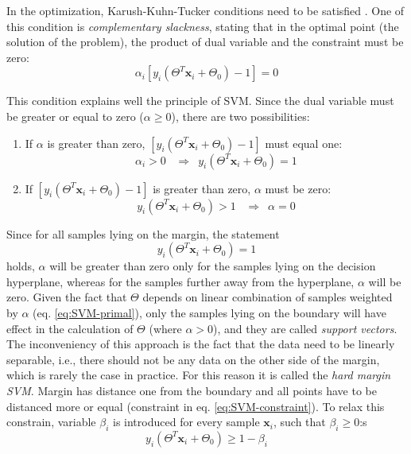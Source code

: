 \begin{appendix}
In the optimization, Karush-Kuhn-Tucker conditions need to be satisfied \citep{Boyd2004}. One of this condition is \emph{complementary slackness}, stating that in the optimal point (the solution of the problem), the product of dual variable and the constraint must be zero:
\begin{equation} 
\alpha_i \left[ y_i \left( \Theta^T\mathbf{x}_i + \Theta_0  \right) -1 \right] = 0
\end{equation}

This condition explains well the principle of SVM. Since the dual variable must be greater or equal to zero ($\alpha \geq 0$), there are two possibilities:
\begin{enumerate}
\item
If $\alpha$ is greater than zero, $\left[ y_i \left( \Theta^T\mathbf{x}_i + \Theta_0  \right) -1 \right]$ must equal one:
\begin{equation} 
\alpha_i > 0 \,\,\,\,\, \Rightarrow \,\,\,  y_i \left( \Theta^T\mathbf{x}_i + \Theta_0  \right) = 1
\end{equation}
\item
If $\left[ y_i \left( \Theta^T\mathbf{x}_i + \Theta_0  \right) -1 \right]$ is greater than zero, $\alpha$ must be zero:
\begin{equation} 
y_i \left( \Theta^T\mathbf{x}_i + \Theta_0  \right) > 1 \,\,\,\,\, \Rightarrow \,\,\,  \alpha = 0
\end{equation}
\end{enumerate}

Since for all samples lying on the margin, the statement  
\begin{equation}
y_i \left( \Theta^T\mathbf{x}_i + \Theta_0  \right) = 1
\end{equation}
\noindent holds, $\alpha$ will be greater than zero only for the samples lying on the decision hyperplane, whereas for the samples further away from the hyperplane, $\alpha$ will be zero. Given the fact that $\Theta$ depends on linear combination of samples weighted by $\alpha$ (eq. \ref{eq:SVM-primal}), only the samples lying on the boundary will have effect in the calculation of $\Theta$ (where $\alpha > 0$), and they are called \emph{support vectors}. The inconveniency of this approach is the fact that the data need to be linearly separable, i.e., there should not be any data on the other side of the margin, which is rarely the case in practice. For this reason it is called the \emph{hard margin SVM}. Margin has distance one from the boundary and all points have to be distanced more or equal (constraint in eq. \ref{eq:SVM-constraint}). To relax this constrain, variable $\beta_i$ is introduced for every sample $\mathbf{x}_i$, such that $\beta_i \geq 0$:s
\begin{equation} 
 y_i \left(\Theta^T \mathbf{x}_i + \Theta_0\right) \geq 1 - \beta_i
\end{equation}


\end{appendix}
